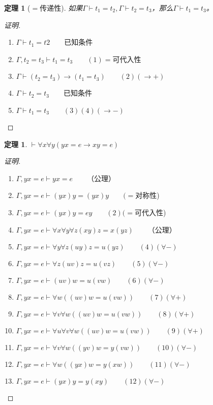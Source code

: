 \documentclass{article}
\newtheorem{Thm}{定理}
\newtheorem*{thm}{定理}
\begin{document}
\begin{CJK*}{UTF8}{gbsn}
\begin{Thm}[$=$传递性]
  如果$\Gamma\vdash t_1=t_2,\Gamma\vdash t_2=t_3$，那么$\Gamma\vdash t_1=t_3$。
\end{Thm}
\begin{proof}[证明]
  $\qquad$
  \begin{enumerate}
    \item $\Gamma\vdash t_1=t2\qquad$已知条件
    \item $\Gamma, t_2=t_3\vdash t_1=t_3\qquad(1)=$可代入性
    \item $\Gamma\vdash (t_2=t_3)\to (t_1=t_3)\qquad(2)(\to +)$
    \item $\Gamma\vdash t_2=t_3\qquad$已知条件
    \item $\Gamma\vdash t_1=t_3\qquad(3)(4)(\to-)$
  \end{enumerate}
\end{proof}
\begin{thm}
  $\vdash \forall x \forall y (yx=e\to xy=e)$
\end{thm}
\begin{proof}[证明]$\qquad$  
\begin{enumerate}
  \item $\Gamma, yx=e \vdash yx = e\qquad$（公理）
  \item $\Gamma, yx=e \vdash (yx)y=(yx)y\qquad(=$对称性)
  \item $\Gamma, yx=e \vdash (yx)y = ey\qquad(2)(=$可代入性)
  \item $\Gamma, yx=e \vdash \forall x\forall y\forall z (xy)z=x(yz)\qquad$（公理）
  \item $\Gamma, yx=e \vdash \forall y\forall z (uy)z=u(yz)\qquad(4)(\forall -)$
  \item $\Gamma, yx=e \vdash \forall z (uv)z=u(vz)\qquad(5)(\forall -)$
  \item $\Gamma, yx=e \vdash (uv)w=u(vw)\qquad(6)(\forall -)$
  \item $\Gamma, yx=e \vdash \forall w((uv)w=u(vw))\qquad(7)(\forall +)$
  \item $\Gamma, yx=e \vdash \forall v\forall w((uv)w=u(vw))\qquad(8)(\forall +)$
  \item $\Gamma, yx=e \vdash \forall u\forall v\forall w((uv)w=u(vw))\qquad(9)(\forall +)$
  \item $\Gamma, yx=e \vdash \forall v\forall w((yv)w=y(vw))\qquad(10)(\forall -)$
  \item $\Gamma, yx=e \vdash \forall w((yx)w=y(xw))\qquad(11)(\forall -)$
  \item $\Gamma, yx=e \vdash (yx)y=y(xy)\qquad(12)(\forall -)$

\end{enumerate}
\end{proof}
\end{CJK*}
\end{document}
